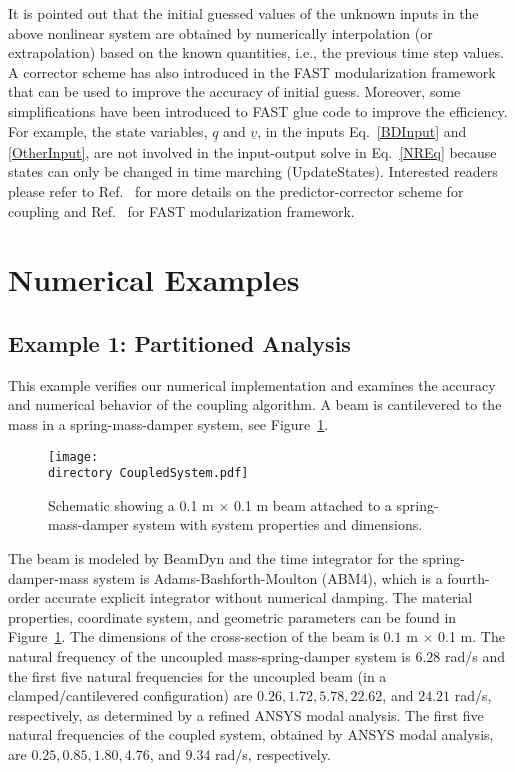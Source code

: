 \documentclass{aiaa-tc}
\def\directory{EPSF/}
\renewcommand{\vec}[1]{\underline{#1}}
\begin{document}
 It is pointed out that the initial guessed values of the unknown inputs in the above nonlinear system are obtained by numerically interpolation (or extrapolation) based on the known quantities, i.e., the previous time step values. A corrector scheme has also introduced in the FAST modularization framework that can be used to improve the accuracy of initial guess. Moreover, some simplifications have been introduced to FAST glue code to improve the efficiency. For example, the state variables, $\vec{q}$ and $\vec{v}$,  in the inputs Eq.~\eqref{BDInput} and \eqref{OtherInput}, are not involved in the input-output solve in Eq.~\eqref{NREq} because states can only be changed in time marching (UpdateStates). Interested readers please refer to Ref.~\cite{Sprague:FAST2015} for more details on the predictor-corrector scheme for coupling and Ref.~\cite{Jonkman:2013} for FAST modularization framework.
 
 
\section{Numerical Examples}
 
\subsection{Example 1: Partitioned Analysis}

This example verifies our numerical implementation and examines the accuracy and numerical behavior of the coupling algorithm. A beam is cantilevered to the mass in a spring-mass-damper system, 
see Figure~\ref{fig:CoupledSystem}. 

 \begin{figure}
\centering
\texttt{[image: \\directory CoupledSystem.pdf]}
\caption{Schematic showing a 0.1 m $\times$ 0.1 m beam attached to a spring-mass-damper system with system properties and dimensions.} 
\label{fig:CoupledSystem}
\end{figure}

The beam is modeled by BeamDyn and the time integrator for the spring-damper-mass system is Adams-Bashforth-Moulton (ABM4), which is a fourth-order accurate explicit integrator without numerical damping. 
The material properties, coordinate system, and geometric parameters can be found in Figure~\ref{fig:CoupledSystem}. 
The dimensions of the cross-section of the beam is $0.1$ m $\times$ 0.1 m. 
The natural frequency of the uncoupled mass-spring-damper system is $6.28$ rad/s and the first five natural frequencies for the uncoupled beam (in a clamped/cantilevered configuration) are $0.26, 1.72, 5.78, 22.62$, and $24.21$ rad/s, respectively, as determined by a refined ANSYS modal analysis. 
The first five natural frequencies of the coupled system, obtained by ANSYS modal analysis, are $0.25, 0.85, 1.80, 4.76$, and $9.34$ rad/s, respectively.
 
\end{document}
